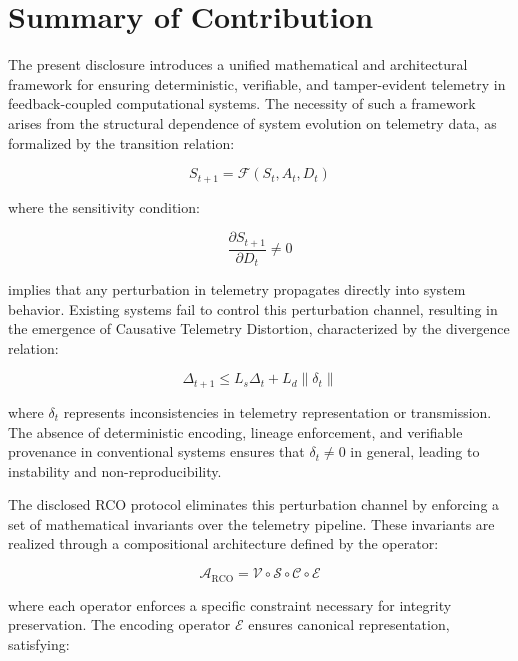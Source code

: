 \section{Summary of Contribution}

The present disclosure introduces a unified mathematical and architectural framework for ensuring deterministic, verifiable, and tamper-evident telemetry in feedback-coupled computational systems. The necessity of such a framework arises from the structural dependence of system evolution on telemetry data, as formalized by the transition relation:

\begin{equation}
S_{t+1} = \mathcal{F}(S_t, A_t, D_t)
\end{equation}

where the sensitivity condition:

\begin{equation}
\frac{\partial S_{t+1}}{\partial D_t} \neq 0
\end{equation}

implies that any perturbation in telemetry propagates directly into system behavior. Existing systems fail to control this perturbation channel, resulting in the emergence of Causative Telemetry Distortion, characterized by the divergence relation:

\begin{equation}
\Delta_{t+1} \leq L_s \Delta_t + L_d \|\delta_t\|
\end{equation}

where $\delta_t$ represents inconsistencies in telemetry representation or transmission. The absence of deterministic encoding, lineage enforcement, and verifiable provenance in conventional systems ensures that $\delta_t \neq 0$ in general, leading to instability and non-reproducibility.

The disclosed RCO protocol eliminates this perturbation channel by enforcing a set of mathematical invariants over the telemetry pipeline. These invariants are realized through a compositional architecture defined by the operator:

\begin{equation}
\mathcal{A}_{\text{RCO}} = \mathcal{V} \circ \mathcal{S} \circ \mathcal{C} \circ \mathcal{E}
\end{equation}

where each operator enforces a specific constraint necessary for integrity preservation. The encoding operator $\mathcal{E}$ ensures canonical representation, satisfying:

